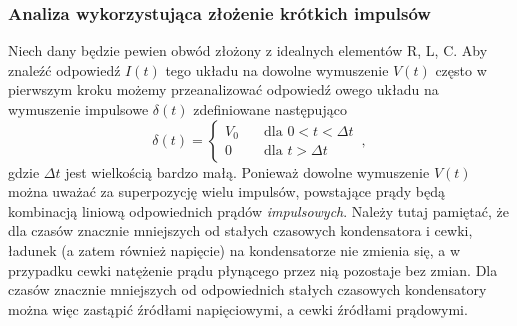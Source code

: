 \documentclass[../main.tex]{subfiles}
\begin{document}
\subsubsection{Analiza wykorzystująca złożenie krótkich impulsów}
Niech dany będzie pewien obwód złożony z idealnych elementów R, L, C. Aby znaleźć odpowiedź \(I(t)\)
tego układu na dowolne wymuszenie \(V(t)\) często w pierwszym kroku możemy przeanalizować odpowiedź
owego układu na wymuszenie impulsowe \(\delta(t)\) zdefiniowane następująco
\begin{equation*}
    \delta(t)=\begin{cases}V_0&\quad\text{dla \(0<t<\Delta t\)}\\ 0 &\quad\text{dla \(t>\Delta t\)}\end{cases}\,,
\end{equation*}
gdzie \(\Delta t\) jest wielkością bardzo małą. Ponieważ dowolne wymuszenie \(V(t)\) można uważać za
superpozycję wielu impulsów, powstające prądy będą kombinacją liniową odpowiednich prądów
\textit{impulsowych}. Należy tutaj pamiętać, że dla czasów znacznie mniejszych od stałych czasowych
kondensatora i cewki, ładunek (a zatem również napięcie) na kondensatorze nie zmienia się, a w
przypadku cewki natężenie prądu płynącego przez nią pozostaje bez zmian. Dla czasów znacznie
mniejszych od odpowiednich stałych czasowych kondensatory można więc zastąpić źródłami napięciowymi,
a cewki źródłami prądowymi.
\end{document}
